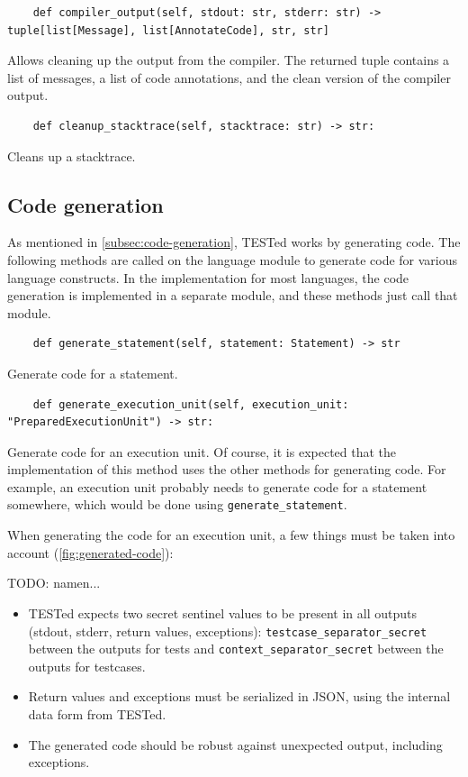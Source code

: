\documentclass[../main]{subfiles}
\begin{document}
\begin{verbatim}
    def compiler_output(self, stdout: str, stderr: str) -> tuple[list[Message], list[AnnotateCode], str, str]
\end{verbatim}

Allows cleaning up the output from the compiler.
The returned tuple contains a list of messages, a list of code annotations, and the clean version of the compiler output.

\begin{verbatim}
    def cleanup_stacktrace(self, stacktrace: str) -> str:
\end{verbatim}

Cleans up a stacktrace.

\subsection{Code generation}\label{subsec:code-generation2}

As mentioned in \cref{subsec:code-generation}, TESTed works by generating code.
The following methods are called on the language module to generate code for various language constructs.
In the implementation for most languages, the code generation is implemented in a separate module, and these methods just call that module.

\begin{verbatim}
    def generate_statement(self, statement: Statement) -> str
\end{verbatim}

Generate code for a statement.

\begin{verbatim}
    def generate_execution_unit(self, execution_unit: "PreparedExecutionUnit") -> str:
\end{verbatim}

Generate code for an execution unit.
Of course, it is expected that the implementation of this method uses the other methods for generating code.
For example, an execution unit probably needs to generate code for a statement somewhere, which would be done using \texttt{generate_statement}.

When generating the code for an execution unit, a few things must be taken into account (\cref{fig:generated-code}):

TODO: namen...
\begin{itemize}
    \item TESTed expects two secret sentinel values to be present in all outputs (stdout, stderr, return values, exceptions): \texttt{testcase\_separator\_secret} between the outputs for tests and \texttt{context\_separator\_secret} between the outputs for testcases.
    \item Return values and exceptions must be serialized in JSON, using the internal data form from TESTed.
    \item The generated code should be robust against unexpected output, including exceptions.
\end{itemize}
\end{document}
